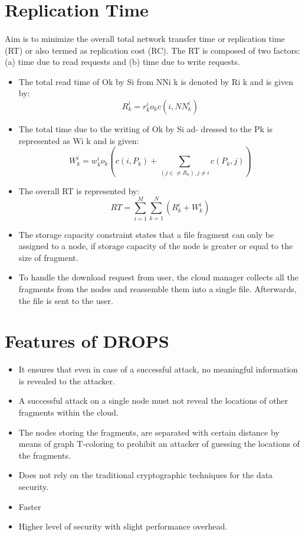 \section{Replication Time}
\paragraph*{}
Aim is to minimize the overall total network transfer time or replication time (RT)
or also termed as replication cost (RC). The RT is composed of two factors: (a) time due
to read requests and (b) time due to write requests.

\begin{itemize}
	\item The total read time of Ok by Si from NNi k is denoted by Ri k and is given by:
	$$ R_{k}^{i} = r_{k}^{i}o_{k}c(i , N N_{k}^{i})$$
	\item The total time due to the writing of Ok by Si ad- dressed to the Pk is represented as Wi
	k and is given:
	\[
	W_{k}^{i} = w_{k}^{i}o_{k}(c(i, P_{k})+ \sum_{ (j \in\neq R_{k}) , j \neq i} c(P_{k}, j))
	\]
	\item The overall RT is represented by:
	\[
	RT = \sum_{i = 1}^{M} \sum_{ k = 1}^{N} (R_{k}^{i} + W_{k}^{i})
	\]
	\item The storage capacity constraint states that a file fragment can only be assigned to a
	node, if storage capacity of the node is greater or equal to the size of fragment.
	\item To handle the download request from user, the cloud manager collects all the fragments from the nodes and reassemble them into a single file. Afterwards, the file is sent to the
	user.
\end{itemize}
\section{Features of DROPS}
\begin{itemize}
	\item It ensures that even in case of a successful attack, no meaningful information is revealed
	to the attacker.
	\item A successful attack on a single node must not reveal the locations of other fragments
	within the cloud.
	\item The nodes storing the fragments, are separated with certain distance by means of graph
	T-coloring to prohibit an attacker of guessing the locations of the fragments.
	\item Does not rely on the traditional cryptographic techniques for the data security.
	\item Faster
	\item Higher level of security with slight performance overhead.
\end{itemize}
